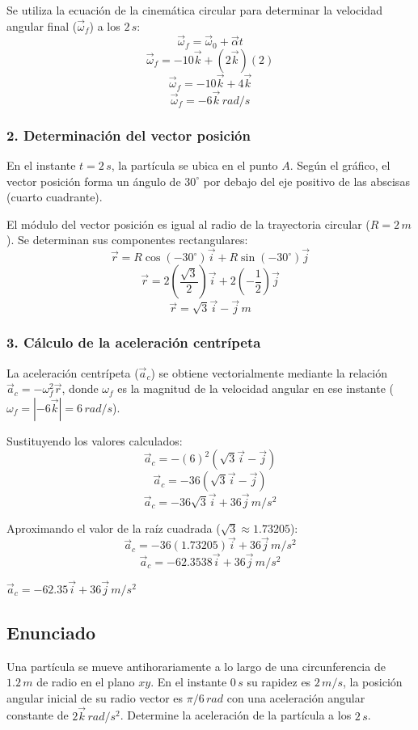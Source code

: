 \documentclass[12pt, a4paper]{article}
\begin{document}
Se utiliza la ecuación de la cinemática circular para determinar la velocidad angular final ($\vec{\omega}_f$) a los $2 \, \si{s}$:
$$ \vec{\omega}_f = \vec{\omega}_0 + \vec{\alpha} t $$
$$ \vec{\omega}_f = -10\vec{k} + (2\vec{k})(2) $$
$$ \vec{\omega}_f = -10\vec{k} + 4\vec{k} $$
$$ \vec{\omega}_f = -6\vec{k} \, \si{rad/s} $$

\subsubsection*{2. Determinación del vector posición}
En el instante $t = 2 \, \si{s}$, la partícula se ubica en el punto $A$. Según el gráfico, el vector posición forma un ángulo de $30^\circ$ por debajo del eje positivo de las abscisas (cuarto cuadrante).

El módulo del vector posición es igual al radio de la trayectoria circular ($R = 2 \, \si{m}$). Se determinan sus componentes rectangulares:
$$ \vec{r} = R\cos(-30^\circ)\vec{i} + R\sin(-30^\circ)\vec{j} $$
$$ \vec{r} = 2\left(\frac{\sqrt{3}}{2}\right)\vec{i} + 2\left(-\frac{1}{2}\right)\vec{j} $$
$$ \vec{r} = \sqrt{3}\vec{i} - \vec{j} \, \si{m} $$

\subsubsection*{3. Cálculo de la aceleración centrípeta}
La aceleración centrípeta ($\vec{a}_c$) se obtiene vectorialmente mediante la relación $\vec{a}_c = -\omega_f^2 \vec{r}$, donde $\omega_f$ es la magnitud de la velocidad angular en ese instante ($\omega_f = |-6\vec{k}| = 6 \, \si{rad/s}$).

Sustituyendo los valores calculados:
$$ \vec{a}_c = -(6)^2 (\sqrt{3}\vec{i} - \vec{j}) $$
$$ \vec{a}_c = -36 (\sqrt{3}\vec{i} - \vec{j}) $$
$$ \vec{a}_c = -36\sqrt{3}\vec{i} + 36\vec{j} \, \si{m/s^2} $$

Aproximando el valor de la raíz cuadrada ($\sqrt{3} \approx 1.73205$):
$$ \vec{a}_c = -36(1.73205)\vec{i} + 36\vec{j} \, \si{m/s^2} $$
$$ \vec{a}_c = -62.3538\vec{i} + 36\vec{j} \, \si{m/s^2} $$

\begin{tcolorbox}[colback=green!5!white, colframe=green!50!black, title=Respuesta Final]
\centering \Large $\vec{a}_c = -62.35\vec{i} + 36\vec{j} \, \si{m/s^2}$
\end{tcolorbox}

\newpage

\subsection*{Enunciado}
Una partícula se mueve antihorariamente a lo largo de una circunferencia de $1.2 \, \si{m}$ de radio en el plano $xy$. En el instante $0 \, \si{s}$ su rapidez es $2 \, \si{m/s}$, la posición angular inicial de su radio vector es $\pi/6 \, \si{rad}$ con una aceleración angular constante de $2\vec{k} \, \si{rad/s^2}$. Determine la aceleración de la partícula a los $2 \, \si{s}$.
\end{document}
